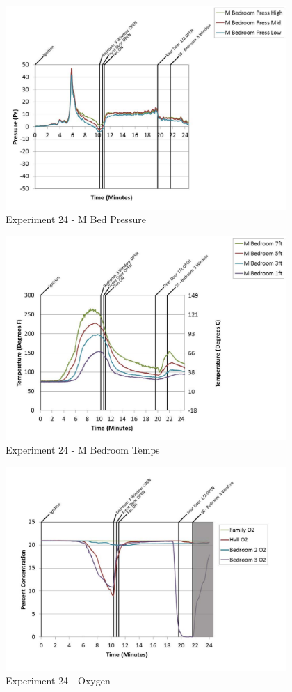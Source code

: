 \documentclass{article}
\begin{document}
\begin{appendices}
	\begin{figure}[h!]
		\centering
		\includegraphics[height=3.05in]{0_Images/Results_Charts/Exp_24_Charts/MBedPressure.pdf}
		\caption{Experiment 24 - M Bed Pressure}
	\end{figure}
 
	\clearpage

	\begin{figure}[h!]
		\centering
		\includegraphics[height=3.05in]{0_Images/Results_Charts/Exp_24_Charts/MBedroomTemps.pdf}
		\caption{Experiment 24 - M Bedroom Temps}
	\end{figure}
 

	\begin{figure}[h!]
		\centering
		\includegraphics[height=3.05in]{0_Images/Results_Charts/Exp_24_Charts/Oxygen.pdf}
		\caption{Experiment 24 - Oxygen}
	\end{figure}
 

\end{appendices}
\end{document}
